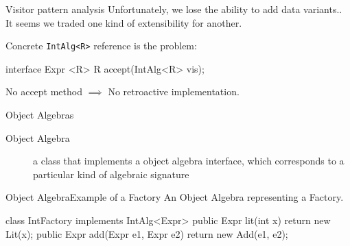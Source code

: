 \documentclass[10pt, compress]{beamer}
\newcommand{\inlinecode}[2]{\colorbox{backg}{\scriptsize{\texttt{#2}}}}
\newenvironment{slide}[1]{\begin{frame}[fragile,environment=slide]{#1}}{\end{frame}}
\newenvironment{slide}[2]{\begin{frame}[fragile,environment=slide]{#1}{#2}}{\end{frame}}
\begin{document}
\begin{slide}{Visitor pattern analysis}
Unfortunately, we lose the ability to add data variants..
It seems we traded one kind of extensibility for another.

Concrete \inlinecode{java}{IntAlg<R>} reference is the problem:
\begin{java}
interface Expr {
  <R> R accept(IntAlg<R> vis);
}
\end{java}

No accept method $\implies$ No retroactive implementation.
\end{slide}


\begin{slide}{Object Algebras}
\begin{description}
\item[Object Algebra] a class that implements a object algebra interface, which corresponds to a particular kind of algebraic signature
\end{description}
\end{slide}


\begin{slide}{Object Algebra}{Example of a Factory}
An Object Algebra representing a Factory.
\begin{java}
class IntFactory implements IntAlg<Expr> {
  public Expr lit(int x) {
    return new Lit(x);
  }
  public Expr add(Expr e1, Expr e2) {
    return new Add(e1, e2);
  }
}
\end{java}
\end{slide}
\end{document}
